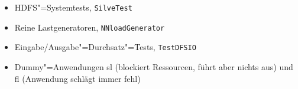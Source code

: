 \begin{itemize}
    \item \ac{HDFS}"=Systemtests, \zB \texttt{SilveTest}
    \item Reine Lastgeneratoren, \zB \texttt{NNloadGenerator}
    \item Eingabe/Ausgabe"=Durchsatz"=Tests, \zB \texttt{TestDFSIO}
    \item Dummy"=Anwendungen \acl{sl} (blockiert Ressourcen, führt aber nichts aus) und \acl{fl} (Anwendung schlägt immer fehl)
\end{itemize}
